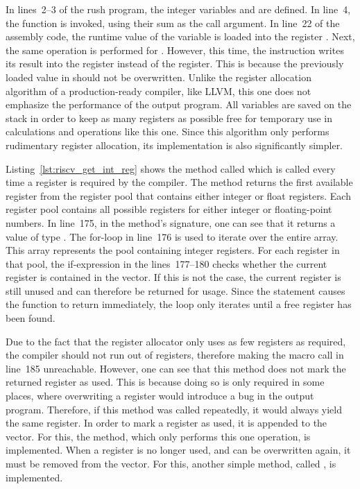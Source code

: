 In lines~2--3 of the rush program, the integer variables  and  are defined.
In line~4, the  function is invoked, using their sum as the call argument.
In line~22 of the assembly code, the runtime value of the variable  is loaded into the register .
Next, the same operation is performed for .
However, this time, the instruction writes its result into the  register instead of the  register.
This is because the previously loaded value in  should not be overwritten.
Unlike the register allocation algorithm of a production-ready compiler, like LLVM,
this one does not emphasize the performance of the output program.
All variables are saved on the stack in order to keep as many registers as possible free for temporary use in calculations and operations like this one.
Since this algorithm only performs rudimentary register allocation, its implementation is also significantly simpler.


Listing~\ref{lst:riscv_get_int_reg} shows the method called  which is called every time a register is required by the compiler.
The method returns the first available register from the register pool that contains either integer or float registers.
Each register pool contains all possible registers for either integer or floating-point numbers.
In line~175, in the method's signature, one can see that it returns a value of type .
The for-loop in line~176 is used to iterate over the entire  array.
This array represents the pool containing integer registers.
For each register in that pool, the if-expression in the lines~177--180 checks whether the current register  is contained in the  vector.
If this is not the case, the current register is still unused and can therefore be returned for usage.
Since the  statement causes the function to return immediately,
the loop only iterates until a free register has been found.

Due to the fact that the register allocator only uses as few registers as required,
the compiler should not run out of registers,
therefore making the  macro call in line~185 unreachable.
However, one can see that this method does not mark the returned register as used.
This is because doing so is only required in some places, where overwriting a register would introduce a bug in the output program.
Therefore, if this method was called repeatedly, it would always yield the same register.
In order to mark a register as used, it is appended to the  vector.
For this, the  method, which only performs this one operation, is implemented.
When a register is no longer used, and can be overwritten again, it must be removed from the  vector.
For this, another simple method, called , is implemented.

